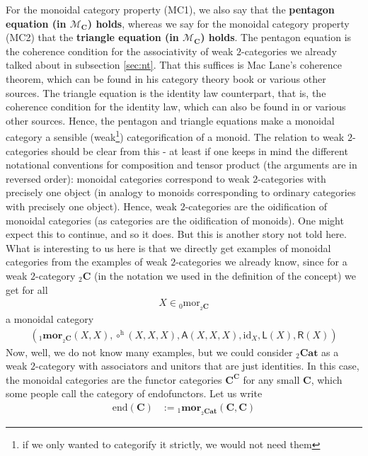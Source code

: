 For the monoidal category property (MC1), we also say that the \textbf{pentagon equation (in $\mathcal{M}_{\mathbf{C}}$) holds}, whereas we say for the monoidal category property (MC2) that the \textbf{triangle equation (in $\mathcal{M}_{\mathbf{C}}$) holds}.
The pentagon equation is the coherence condition for the associativity of weak $2$-categories we already talked about in subsection \ref{sec:nt}.
That this suffices is Mac Lane's coherence theorem, which can be found in his category theory book \cite{e837ef86} or various other sources.
The triangle equation is the identity law counterpart, that is, the coherence condition for the identity law, which can also be found in \cite{e837ef86} or various other sources.
Hence, the pentagon and triangle equations make a monoidal category a sensible (weak\footnote{if we only wanted to categorify it strictly, we would not need them}) categorification of a monoid.
The relation to weak $2$-categories should be clear from this - at least if one keeps in mind the different notational conventions for composition and tensor product (the arguments are in reversed order): monoidal categories correspond to weak $2$-categories with precisely one object (in analogy to monoids corresponding to ordinary categories with precisely one object).
Hence, weak $2$-categories are the oidification of monoidal categories (as categories are the oidification of monoids).
One might expect this to continue, and so it does.
But this is another story not told here.
What is interesting to us here is that we directly get examples of monoidal categories from the examples of weak $2$-categories we already know, since for a weak $2$-category ${}_{2}\mathbf{C}$ (in the notation we used in the definition of the concept) we get for all
\begin{align*}
  X
  \in
  {}_{0}\mathrm{mor}_{{}_{2}\mathbf{C}}
\end{align*}
a monoidal category
\begin{align*}
  \left(
    {}_{1}\mathbf{mor}_{{}_{2}\mathbf{C}}(X,X),
    \circ^{\textrm{h}}(X,X,X),
    \mathsf{A}(X,X,X),
    \mathrm{id}_{X},
    \mathsf{L}(X),
    \mathsf{R}(X)
  \right)
\end{align*}
Now, well, we do not know many examples, but we could consider ${}_{2}\mathbf{Cat}$ as a weak $2$-category with associators and unitors that are just identities.
In this case, the monoidal categories are the functor categories $\mathbf{C}^{\mathbf{C}}$ for any small $\mathbf{C}$, which some people call the category of endofunctors.
Let us write
\begin{align*}
  \mathrm{end}(\mathbf{C})
  &:=
  {}_{1}\mathbf{mor}_{{}_{2}\mathbf{Cat}}(\mathbf{C},\mathbf{C})
\end{align*}
